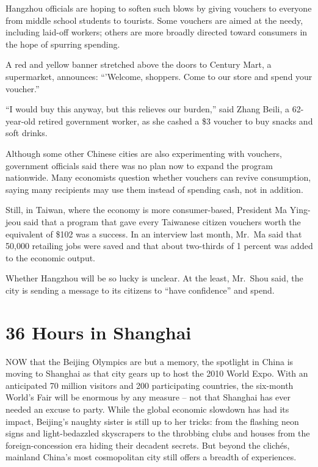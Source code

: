 \documentclass[12pt,a4paper,onecolumn]{article}
\begin{document}
\begin{CJK*}{GBK}{song}
Hangzhou officials are hoping to soften such blows by giving vouchers to everyone from middle school
students to tourists. Some vouchers are aimed at the needy, including laid-off workers; others are
more broadly directed toward consumers in the hope of spurring spending.

A red and yellow banner stretched above the doors to Century Mart, a supermarket, announces:
``'Welcome, shoppers. Come to our store and spend your voucher.''

``I would buy this anyway, but this relieves our burden,'' said Zhang Beili, a 62-year-old retired
government worker, as she cashed a \$3 voucher to buy snacks and soft drinks.

Although some other Chinese cities are also experimenting with vouchers, government officials said
there was no plan now to expand the program nationwide. Many economists question whether vouchers
can revive consumption, saying many recipients may use them instead of spending cash, not in
addition.

Still, in Taiwan, where the economy is more consumer-based, President Ma Ying-jeou said that a
program that gave every Taiwanese citizen vouchers worth the equivalent of \$102 was a success. In
an interview last month, Mr.~Ma said that 50,000 retailing jobs were saved and that about two-thirds
of 1 percent was added to the economic output.

Whether Hangzhou will be so lucky is unclear. At the least, Mr.~Shou said, the city is sending a
message to its citizens to ``have confidence'' and spend.

\section{36 Hours in Shanghai}

NOW that the Beijing Olympics are but a memory, the spotlight in China is moving to Shanghai as that
city gears up to host the 2010 World Expo. With an anticipated 70 million visitors and 200
participating countries, the six-month World's Fair will be enormous by any measure -- not that
Shanghai has ever needed an excuse to party. While the global economic slowdown has had its impact,
Beijing's naughty sister is still up to her tricks: from the flashing neon signs and light-bedazzled
skyscrapers to the throbbing clubs and houses from the foreign-concession era hiding their decadent
secrets. But beyond the clich\'es, mainland China's most cosmopolitan city still offers a breadth of
experiences.


\end{CJK*}
\end{document}
